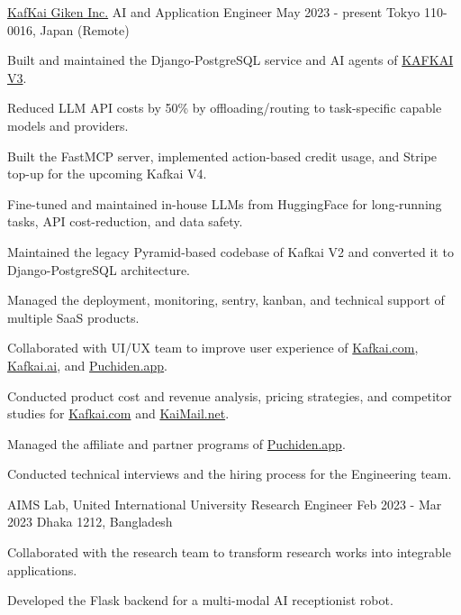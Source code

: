 \begin{cventries}
\cventry
    {\href{https://kafkai.com/}{KafKai Giken Inc.}} %
    {AI and Application Engineer} %
    {May 2023 - present} %
    {Tokyo 110-0016, Japan (Remote)} %
    {
      \begin{cvitems} %
        \item{Built and maintained the Django-PostgreSQL service and AI agents of \href{https://kafkai.com/}{\textcolor{Cerulean}{KAFKAI V3}}.}
        \item{Reduced LLM API costs by 50\% by offloading/routing to task-specific capable models and providers.}
        \item{Built the FastMCP server, implemented action-based credit usage, and Stripe top-up for the upcoming Kafkai V4.}
        \item{Fine-tuned and maintained in-house LLMs from HuggingFace for long-running tasks, API cost-reduction, and data safety.}
        \item{Maintained the legacy Pyramid-based codebase of Kafkai V2 and converted it to Django-PostgreSQL architecture.}
        \item{Managed the deployment, monitoring, sentry, kanban, and technical support of multiple SaaS products.}
        \item{Collaborated with UI/UX team to improve user experience of \href{https://kafkai.com/}{\textcolor{Cerulean}{Kafkai.com}}, \href{https://kafkai.ai/}{\textcolor{Cerulean}{Kafkai.ai}}, and \href{https://puchiden.app/}{\textcolor{Cerulean}{Puchiden.app}}.}
        \item{Conducted product cost and revenue analysis, pricing strategies, and competitor studies for \href{https://kafkai.com/}{\textcolor{Cerulean}{Kafkai.com}} and \href{https://kaimail.net/}{\textcolor{Cerulean}{KaiMail.net}}.}
        \item{Managed the affiliate and partner programs of \href{https://puchiden.app/}{\textcolor{Cerulean}{Puchiden.app}}.}
        \item{Conducted technical interviews and the hiring process for the Engineering team.}
      \end{cvitems}
    }


\cventry
  {AIMS Lab, United International University} %
  {Research Engineer} %
  {Feb 2023 - Mar 2023} %
  {Dhaka 1212, Bangladesh} %
{
  \begin{cvitems}
    \item{Collaborated with the research team to transform research works into integrable applications.}
    \item{Developed the Flask backend for a multi-modal AI receptionist robot.}
  \end{cvitems}
}


\end{cventries}
